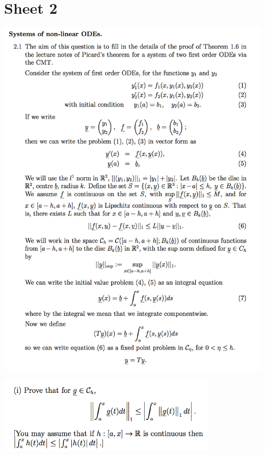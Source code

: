 \documentclass[12pt]{article}
\begin{document}
\newpage
\section{Sheet 2}

\begin{mdframed}
\includegraphics[width=400pt]{img/differential-equations-a1-2-1-0.png}
\end{mdframed}
\begin{mdframed}
\includegraphics[width=300pt]{img/differential-equations-a1-2-1-1.png}
\end{mdframed}
\end{document}
